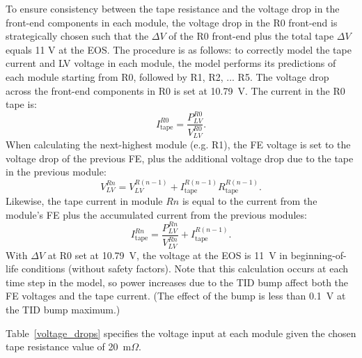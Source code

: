To ensure consistency between
the tape resistance and the voltage drop in the front-end components in each module,
the voltage drop in the R0 front-end is strategically chosen such that the $\Delta V$
of the R0 front-end plus the total tape $\Delta V$ equals 11 V at the EOS.
The procedure is as follows:
to correctly model the tape current and LV voltage in each module, the model performs its predictions
of each module starting from R0, followed by R1, R2, ... R5. The voltage drop across the front-end
components in R0 is set at 10.79~V. The current in the R0 tape is:
%
\[
I^{R0}_\text{tape} = \frac{P^{R0}_{LV}}{V^{R0}_{LV}}.
\]
When calculating the next-highest module (e.g. R1), the FE voltage is set to the voltage drop of the
previous FE, plus the additional voltage drop due to the tape in the previous module:
\[
V^{Rn}_{LV} = V^{R(n-1)}_{LV} + I^{R(n-1)}_\text{tape} R^{R(n-1)}_\text{tape}.
\]
Likewise, the tape current in module $Rn$ is equal to the current from the module's FE plus the
accumulated current from the previous modules:
\[
I^{Rn}_\text{tape} = \frac{P^{Rn}_{LV}}{V^{Rn}_{LV}} + I^{R(n-1)}_\text{tape}.
\]
With $\Delta V$ at R0 set at 10.79~V, the voltage at the EOS is 11~V in beginning-of-life conditions
(without safety factors).
Note that this calculation occurs at each time step in the model, so power increases due to the TID
bump affect both the FE voltages and the tape current.
(The effect of the bump is less than 0.1~V at the TID bump maximum.)

Table~\ref{voltage_drops} specifies the voltage input at each module given the
chosen tape resistance value of 20~m$\Omega$.

\begin{table}[ht]
\begin{center}
\end{center}
\caption{Voltage inputs for each endcap module. The EOS is assumed to have an 11V input voltage.}
\label{voltage_drops}
\end{table}

